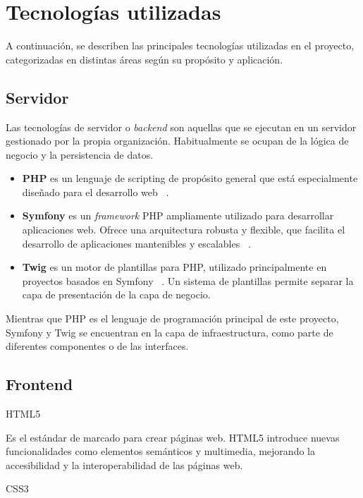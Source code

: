 \section{Tecnologías utilizadas}

A continuación, se describen las principales tecnologías utilizadas en el proyecto, categorizadas en distintas áreas
según su propósito y aplicación.

\subsection*{Servidor}

Las tecnologías de servidor o \textit{backend} son aquellas que se ejecutan en un servidor gestionado por la propia
organización.
Habitualmente se ocupan de la lógica de negocio y la persistencia de datos.

\begin{itemize}
    \item \textbf{PHP} es un lenguaje de scripting de propósito general que está especialmente diseñado para el
    desarrollo web ~\cite{https://www.php.net/}.
    \item \textbf{Symfony} es un \textit{framework} PHP ampliamente utilizado para desarrollar aplicaciones web.
    Ofrece una arquitectura robusta y flexible, que facilita el desarrollo de aplicaciones mantenibles y escalables
    ~\cite{https://symfony.com/}.
    \item \textbf{Twig} es un motor de plantillas para PHP, utilizado principalmente en proyectos basados en
    Symfony ~\cite{https://twig.symfony.com/}.
    Un sistema de plantillas permite separar la capa de presentación de la capa de negocio.
\end{itemize}

Mientras que PHP es el lenguaje de programación principal de este proyecto, Symfony y Twig se encuentran en la capa
de infraestructura, como parte de diferentes componentes o de las interfaces.

\subsection*{Frontend}

HTML5

Es el estándar de marcado para crear páginas web.
HTML5 introduce nuevas funcionalidades como elementos semánticos y multimedia, mejorando la accesibilidad y la
interoperabilidad de las páginas web.

CSS3

